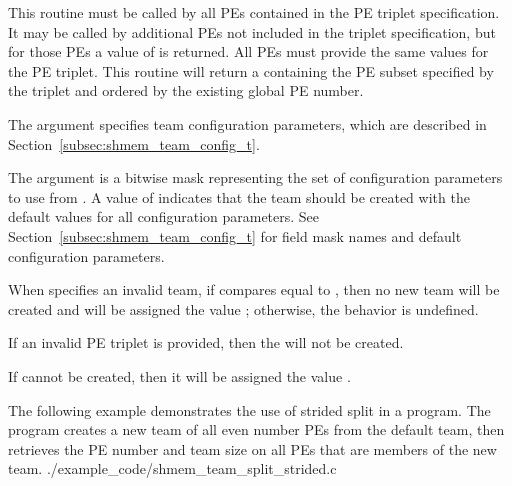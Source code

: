 \begin{apidefinition}
{This routine must be called by all \acp{PE} contained in the \ac{PE} triplet
specification. It may be called by additional \acp{PE} not included in the
triplet specification, but for those \acp{PE} a  value of
 is returned. All \acp{PE} must provide the
same values for the \ac{PE} triplet. This routine will return a 
containing the \ac{PE} subset specified by the triplet and ordered by the
existing global \ac{PE} number.

The  argument specifies team configuration parameters, which are
described in Section~\ref{subsec:shmem_team_config_t}.

The  argument is a bitwise mask representing the set of
configuration parameters to use from .
A  value of  indicates that the team
should be created with the default values for all configuration parameters.
See Section~\ref{subsec:shmem_team_config_t} for field mask names and
default configuration parameters.

When  specifies an invalid team, if 
compares equal to , then no new team
will be created and  will be assigned the value
; otherwise, the behavior is undefined.

If an invalid \ac{PE} triplet is provided, then the  will not be created.

If  cannot be created, then it will be assigned the value
.
}



\begin{apiexamples}

    \apicexample
    {The following example demonstrates the use of strided split in a
    \Cstd[11] program. The program creates a new team of all even number
    \acp{PE} from the default team, then retrieves the \ac{PE} number and
    team size on all \acp{PE} that are members of the new team.}
    {./example_code/shmem_team_split_strided.c}
    {}

\end{apiexamples}

\end{apidefinition}
